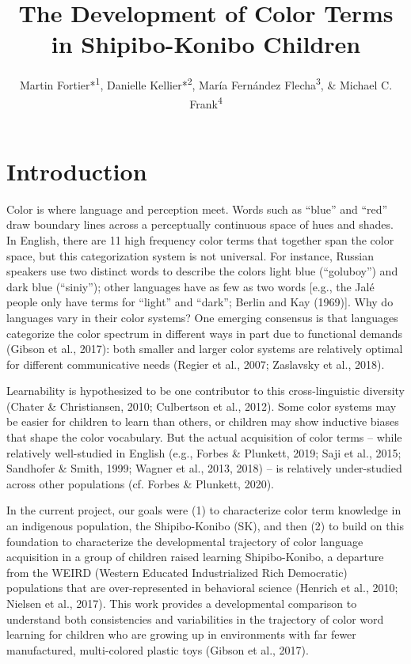 \documentclass[
  english,
  ,apa7,floatsintext]{apa6}
\title{The Development of Color Terms in Shipibo-Konibo Children}
\author{Martin Fortier*\textsuperscript{1}, Danielle Kellier*\textsuperscript{2}, María Fernández Flecha\textsuperscript{3}, \& Michael C. Frank\textsuperscript{4}}
\date{}
\affiliation{\vspace{0.5cm}\textsuperscript{1} PSL Research University\\\textsuperscript{2} University of Pennsylvania\\\textsuperscript{3} Pontificia Universidad Católica del Perú\\\textsuperscript{4} Stanford University}
\begin{document}
\maketitle

\hypertarget{introduction}{%
\section{Introduction}\label{introduction}}

Color is where language and perception meet. Words such as ``blue'' and ``red'' draw boundary lines across a perceptually continuous space of hues and shades. In English, there are 11 high frequency color terms that together span the color space, but this categorization system is not universal. For instance, Russian speakers use two distinct words to describe the colors light blue (``goluboy'') and dark blue (``siniy''); other languages have as few as two words {[}e.g., the Jalé people only have terms for ``light'' and ``dark''; Berlin and Kay (1969){]}. Why do languages vary in their color systems? One emerging consensus is that languages categorize the color spectrum in different ways in part due to functional demands (Gibson et al., 2017): both smaller and larger color systems are relatively optimal for different communicative needs (Regier et al., 2007; Zaslavsky et al., 2018).

Learnability is hypothesized to be one contributor to this cross-linguistic diversity (Chater \& Christiansen, 2010; Culbertson et al., 2012). Some color systems may be easier for children to learn than others, or children may show inductive biases that shape the color vocabulary. But the actual acquisition of color terms -- while relatively well-studied in English (e.g., Forbes \& Plunkett, 2019; Saji et al., 2015; Sandhofer \& Smith, 1999; Wagner et al., 2013, 2018) -- is relatively under-studied across other populations (cf. Forbes \& Plunkett, 2020).

In the current project, our goals were (1) to characterize color term knowledge in an indigenous population, the Shipibo-Konibo (SK), and then (2) to build on this foundation to characterize the developmental trajectory of color language acquisition in a group of children raised learning Shipibo-Konibo, a departure from the WEIRD (Western Educated Industrialized Rich Democratic) populations that are over-represented in behavioral science (Henrich et al., 2010; Nielsen et al., 2017). This work provides a developmental comparison to understand both consistencies and variabilities in the trajectory of color word learning for children who are growing up in environments with far fewer manufactured, multi-colored plastic toys (Gibson et al., 2017).
\end{document}
